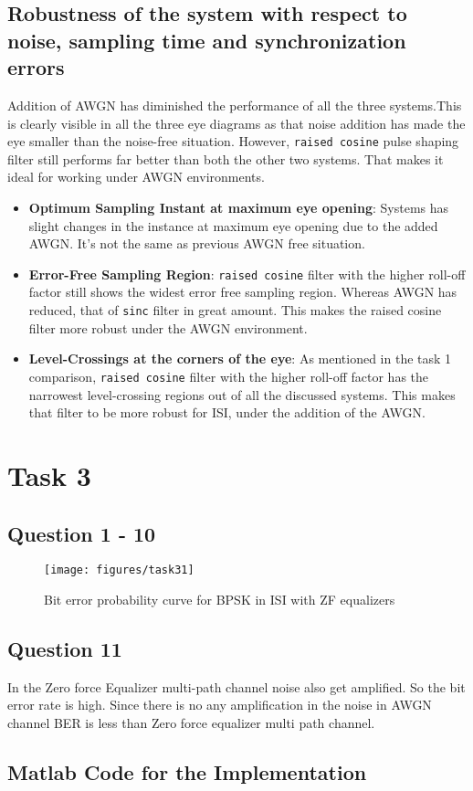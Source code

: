 \documentclass[a4paper,11pt]{article}%
\begin{document}
\subsection{Robustness of the system with respect to noise, sampling time and synchronization errors}

Addition of AWGN has diminished the performance of all the three systems.This is clearly visible in all the three eye diagrams as that noise addition has made the eye smaller than the noise-free situation. However, {\tt raised cosine} pulse shaping filter still performs far better than both the other two systems. That makes it ideal for working under AWGN environments.

\begin{itemize}
	\item \textbf{Optimum Sampling Instant at maximum eye opening}: Systems has slight changes in the instance at maximum eye opening due to the added AWGN. 
	It's not the same as previous AWGN free situation.
	\item \textbf{Error-Free Sampling Region}: {\tt raised cosine} filter with  the higher roll-off factor still shows the widest error free sampling region. Whereas AWGN has reduced, that of {\tt sinc} filter in great amount. This makes the raised cosine filter more robust under the AWGN environment.
	\item \textbf{Level-Crossings at the corners of the eye}: As mentioned in the task 1 comparison, {\tt raised cosine} filter with  the higher roll-off factor has the narrowest level-crossing regions out of all the discussed systems. This makes that filter to be more robust for ISI, under the addition of the AWGN.
	
\end{itemize}

\section{Task 3}
\subsection{Question 1 - 10}
\begin{figure}[H]
	\centering
	\texttt{[image: figures/task31]}
	\caption{Bit error probability curve for BPSK in ISI with ZF equalizers}
\end{figure}

\subsection{Question 11}
In the Zero force Equalizer multi-path channel noise also get amplified. So the bit error rate is high. Since there is no any amplification in the noise in AWGN channel BER is less than Zero force equalizer multi path channel.


\begin{appendices}
	\section{Matlab Code for the Implementation}
	
\end{appendices}

\end{document}
